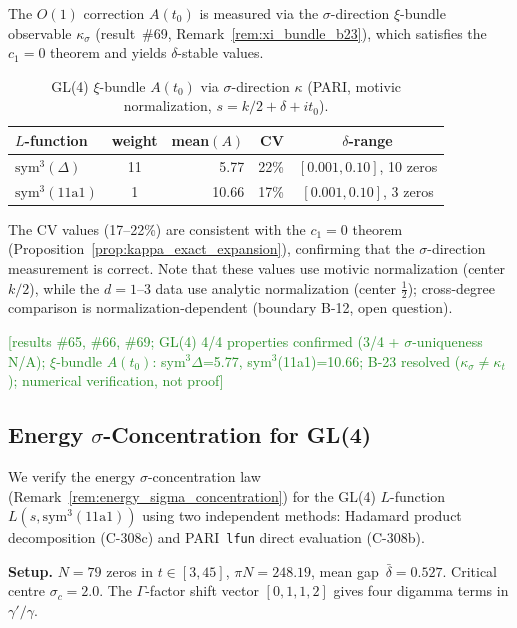 \documentclass[11pt, a4paper]{article}
\theoremstyle{definition}
\theoremstyle{plain}
\begin{document}
The $O(1)$ correction $A(t_0)$ is measured via the $\sigma$-direction
$\xi$-bundle observable $\kappa_\sigma$ (result~\#69, Remark~\ref{rem:xi_bundle_b23}),
which satisfies the $c_1 = 0$ theorem and yields $\delta$-stable values.

\begin{table}[ht]
\centering
\caption{GL(4) $\xi$-bundle $A(t_0)$ via $\sigma$-direction $\kappa$
(PARI, motivic normalization, $s = k/2 + \delta + it_0$).
\label{tab:gl4_xi_bundle}}
\smallskip
\begin{tabular}{lcrrc}
\toprule
$L$-function & weight & mean$(A)$ & CV & $\delta$-range \\
\midrule
$\mathrm{sym}^3(\Delta)$ & 11 & 5.77 & 22\% & $[0.001, 0.10]$, 10 zeros \\
$\mathrm{sym}^3(11\mathrm{a}1)$ & 1 & 10.66 & 17\% & $[0.001, 0.10]$, 3 zeros \\
\bottomrule
\end{tabular}
\end{table}

\noindent
The CV values (17--22\%) are consistent with the $c_1 = 0$ theorem
(Proposition~\ref{prop:kappa_exact_expansion}), confirming that the
$\sigma$-direction measurement is correct.
Note that these values use motivic normalization (center $k/2$),
while the $d = 1$--$3$ data use analytic normalization (center $\tfrac{1}{2}$);
cross-degree comparison is normalization-dependent (boundary B-12, open question).

\textcolor{ForestGreen}{[results \#65, \#66, \#69; GL(4) 4/4 properties confirmed
(3/4 + $\sigma$-uniqueness N/A); $\xi$-bundle $A(t_0)$: sym$^3\Delta$=5.77,
sym$^3$(11a1)=10.66; B-23 resolved ($\kappa_\sigma \neq \kappa_t$);
numerical verification, not proof]}

\subsection{Energy $\sigma$-Concentration for GL(4)}
\label{subsec:gl4_energy}

We verify the energy $\sigma$-concentration law
(Remark~\ref{rem:energy_sigma_concentration}) for the GL(4) $L$-function
$L(s,\mathrm{sym}^3(11\mathrm{a}1))$ using two independent methods:
Hadamard product decomposition (C-308c) and PARI~\texttt{lfun}
direct evaluation (C-308b).

\smallskip\noindent
\textbf{Setup.}\;
$N=79$ zeros in $t\in[3,45]$, $\pi N=248.19$, mean gap~$\bar\delta=0.527$.
Critical centre $\sigma_c=2.0$.
The $\Gamma$-factor shift vector $[0,1,1,2]$ gives four digamma terms
in $\gamma'/\gamma$.
\end{document}
